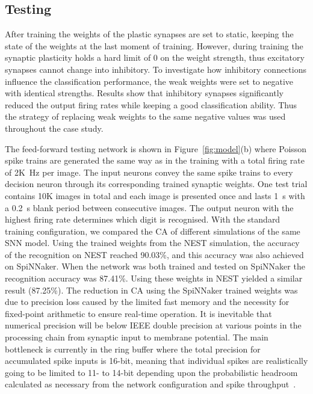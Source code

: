 \subsection{Testing}
After training the weights of the plastic synapses are set to static, keeping the state of the weights at the last moment of training.
However, during training the synaptic plasticity holds a hard limit of 0 on the weight strength, thus excitatory synapses cannot change into inhibitory.
To investigate how inhibitory connections influence the classification performance, the weak weights were set to negative with identical strengths.
Results show that inhibitory synapses significantly reduced the output firing rates while keeping a good classification ability.
Thus the strategy of replacing weak weights to the same negative values was used throughout the case study.

The feed-forward testing network is shown in Figure~\ref{fig:model}(b) where Poisson spike trains are generated the same way as in the training with a total firing rate of 2K~Hz per image.
The input neurons convey the same spike trains to every decision neuron through its corresponding trained synaptic weights. 
One test trial contains 10K images in total and each image is presented once and lasts 1~s with a 0.2~s blank period between consecutive images.
The output neuron with the highest firing rate determines which digit is recognised.
With the standard training configuration, we compared the CA of different simulations of the same SNN model.
Using the trained weights from the NEST simulation, the accuracy of the recognition on NEST reached 90.03\%, and this accuracy was also achieved on SpiNNaker.
When the network was both trained and tested on SpiNNaker the recognition accuracy was 87.41\%.
Using these weights in NEST yielded a similar result (87.25\%). 
The reduction in CA using the SpiNNaker trained weights was due to precision loss caused by the limited fast memory and the necessity for fixed-point arithmetic to ensure real-time operation.
It is inevitable that numerical precision will be below IEEE double precision at various points in the processing chain from synaptic input to membrane potential.
The main bottleneck is currently in the ring buffer where the total precision for accumulated spike inputs is 16-bit, meaning that individual spikes are realistically going to be limited to 11- to 14-bit depending upon the probabilistic headroom calculated as necessary from the network configuration and spike throughput~\citep{Hopkins2015Accuracy}.

